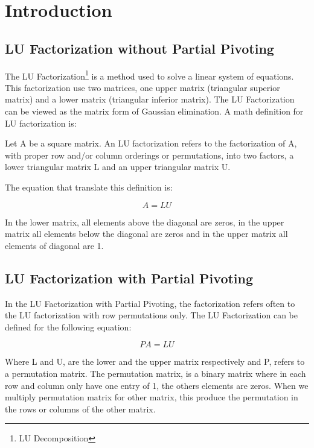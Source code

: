 \documentclass[conference,compsoc]{IEEEtran}
\begin{document}
\section{Introduction}
\subsection{LU Factorization without Partial Pivoting}
The LU Factorization\footnote{LU Decomposition} is a method used to solve a linear system of equations. This factorization use two matrices, one upper matrix (triangular superior matrix) and a lower matrix (triangular inferior matrix). The LU Factorization can be viewed as the matrix form of Gaussian elimination. A math definition for LU factorization is:

\begin{displayquote}
Let A be a square matrix. An LU factorization refers to the factorization of A, with proper row and/or column orderings or permutations, into two factors, a lower triangular matrix L and an upper triangular matrix U.
\end{displayquote}

The equation that translate this definition is:

\begin{equation}
    A = LU
\end{equation}

In the lower matrix, all elements above the diagonal are zeros, in the upper matrix all elements below the diagonal are zeros and in the upper matrix all elements of diagonal are 1.

\subsection{LU Factorization with Partial Pivoting}
In the LU Factorization with Partial Pivoting, the factorization refers often to the LU factorization with row permutations only. The LU Factorization can be defined for the following equation:

\begin{equation}
    PA = LU
\end{equation}

Where L and U, are the lower and the upper matrix respectively and P, refers to a permutation matrix. The permutation matrix, is a binary matrix where in each row and column only have one entry of 1, the others elements are zeros. When we multiply permutation matrix for other matrix, this produce the permutation in the rows or columns of the other matrix. 
\end{document}
